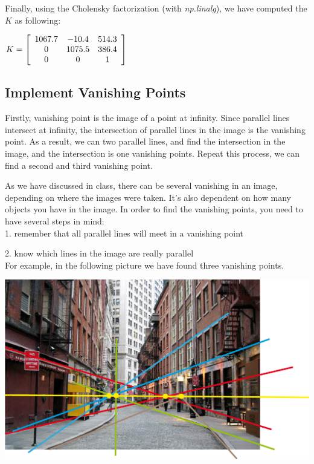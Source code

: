 \documentclass[]{article}
\begin{document}
\vspace{0.5em}

Finally, using the Cholensky factorization (with \textit{np.linalg}), we have computed the $K$ as following:

\vspace{0.5em}

\centerline {
	$ K =\left[ {\begin{array}{*{20}c}
		1067.7 & -10.4 & 514.3 \\
		0 & 1075.5 & 386.4 \\
		0 & 0 & 1 
		\end{array} } \right] $
}

\vspace{0.5em}


\subsection{Implement Vanishing Points}

Firstly, vanishing point is the image of a point at infinity. Since parallel lines intersect at infinity, the intersection of parallel lines in the image is the vanishing point. As a result, we can two parallel lines, and find the intersection in the image, and the intersection is one vanishing points. Repeat this process, we can find a second and third vanishing point.

As we have discussed in class, there can be several vanishing in an image, depending on where the images were taken. It's also dependent on how many objects you have in the image. In order to find the vanishing points, you need to have several steps in mind: \\

1. remember that all parallel lines will meet in a vanishing point

2. know which lines in the image are really parallel \\ 

For example, in the following picture we have found three vanishing points. 

\vspace{0.5em}

\centerline {
	\includegraphics[scale=0.4]{vanishing}
}
\end{document}
